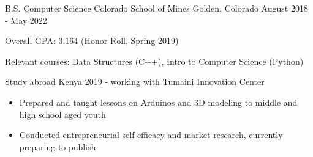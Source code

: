 \vspace{-2.0mm}


\begin{cventries}

  \cventry
    {B.S. Computer Science}
    {Colorado School of Mines} %
    {Golden, Colorado} %
    {August 2018 - May 2022} %
    {
      \begin{cvitems} %
        \item {Overall GPA: 3.164 (Honor Roll, Spring 2019)}
        \item {Relevant courses: Data Structures (C++), Intro to Computer Science
    (Python)}
\item {Study abroad Kenya 2019 - working with Tumaini Innovation Center}
  \begin{itemize}
    \item {Prepared and taught lessons on Arduinos and 3D modeling to middle and high school aged youth}
    \item {Conducted entrepreneurial self-efficacy and market research, currently preparing to publish}
\end{itemize}
      \end{cvitems}
    }
    

\end{cventries}

